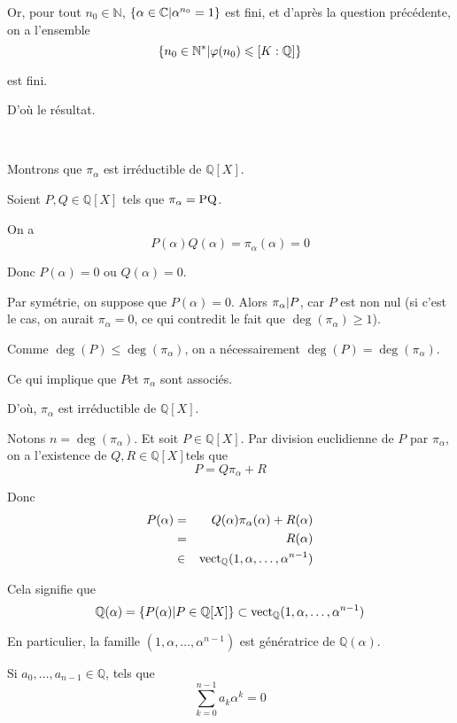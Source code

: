 Or, pour tout $n_0 \in \mathbb{N}$, $\{ \alpha \in \mathbb{C} | 
\alpha^{n_0} = 1 \}$ est fini, et d'apr{\`e}s la question pr{\'e}c{\'e}dente,
on a l'ensemble
\[ \{ n_0 \in \mathbb{N}^{\ast}  |  \varphi (n_0) \leqslant [K :
   \mathbb{Q}] \} \]


est fini.

D'o{\`u} le r{\'e}sultat.

\

Montrons que $\pi_{\alpha}$ est irr{\'e}ductible de
$\mathbb{Q} [X]$.

Soient $P, Q \in \mathbb{Q} [X]$ tels que $\pi_{\alpha} = \operatorname{PQ}$.

On a
\[ P (\alpha) Q (\alpha) = \pi_{\alpha} (\alpha) = 0 \]


Donc $P (\alpha) = 0$ ou $Q (\alpha) = 0$.

Par sym{\'e}trie, on suppose que $P (\alpha) = 0$. Alors $\pi_{\alpha} | P
$, car $P$ est non nul (si c'est le cas, on aurait $\pi_{\alpha} =
0$, ce qui contredit le fait que $\deg (\pi_{\alpha}) \geqslant 1$).

Comme $\deg (P) \leqslant \deg (\pi_{\alpha})$, on a n{\'e}cessairement $\deg
(P) = \deg (\pi_{\alpha})$.

Ce qui implique que $P$et $\pi_{\alpha}$ sont associ{\'e}s.

D'o{\`u}, $\pi_{\alpha}$ est irr{\'e}ductible de $\mathbb{Q} [X]$.

Notons $n = \deg (\pi_{\alpha})$. Et soit $P \in \mathbb{Q} [X] .$ Par
division euclidienne de $P$ par $\pi_{\alpha}$, on a l'existence de $Q, R \in
\mathbb{Q} [X] $tels que
\[ P = Q \pi_{\alpha} + R \]


Donc
\begin{eqnarray*}
  P (\alpha) & = & Q (\alpha) \pi_{\alpha} (\alpha) + R (\alpha)\\
  & = & R (\alpha)\\
  & \in & \operatorname{vect}_{\mathbb{Q}} (1, \alpha, \ldots, \alpha^{n - 1})
\end{eqnarray*}


Cela signifie que
\[ \mathbb{Q} (\alpha) = \{ P (\alpha)  |  P \in \mathbb{Q} [X] \}
   \subset \operatorname{vect}_{\mathbb{Q}} (1, \alpha, \ldots, \alpha^{n - 1}) \]


En particulier, la famille $(1, \alpha, \ldots, \alpha^{n - 1})$ est
g{\'e}n{\'e}ratrice de $\mathbb{Q} (\alpha)$.

Si $a_0, \ldots, a_{n - 1} \in \mathbb{Q}$, tels que
\[ \underset{k = 0}{\overset{n - 1}{\sum}} a_k \alpha^k = 0 \]


